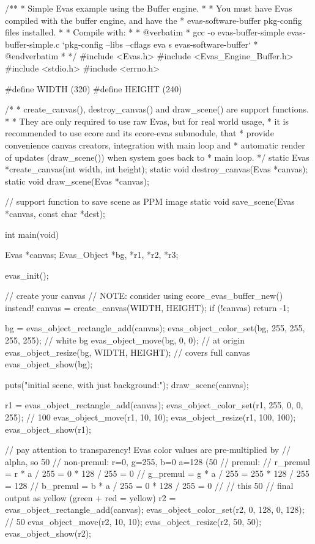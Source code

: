 \begin{DoxyCodeInclude}
/**
 * Simple Evas example using the Buffer engine.
 *
 * You must have Evas compiled with the buffer engine, and have the
 * evas-software-buffer pkg-config files installed.
 *
 * Compile with:
 *
 * @verbatim
 * gcc -o evas-buffer-simple evas-buffer-simple.c `pkg-config --libs --cflags eva
      s evas-software-buffer`
 * @endverbatim
 *
 */
#include <Evas.h>
#include <Evas_Engine_Buffer.h>
#include <stdio.h>
#include <errno.h>

#define WIDTH (320)
#define HEIGHT (240)

/*
 * create_canvas(), destroy_canvas() and draw_scene() are support functions.
 *
 * They are only required to use raw Evas, but for real world usage,
 * it is recommended to use ecore and its ecore-evas submodule, that
 * provide convenience canvas creators, integration with main loop and
 * automatic render of updates (draw_scene()) when system goes back to
 * main loop.
 */
static Evas *create_canvas(int width, int height);
static void destroy_canvas(Evas *canvas);
static void draw_scene(Evas *canvas);

// support function to save scene as PPM image
static void save_scene(Evas *canvas, const char *dest);

int main(void)
{
   Evas *canvas;
   Evas_Object *bg, *r1, *r2, *r3;

   evas_init();

   // create your canvas
   // NOTE: consider using ecore_evas_buffer_new() instead!
   canvas = create_canvas(WIDTH, HEIGHT);
   if (!canvas)
     return -1;

   bg = evas_object_rectangle_add(canvas);
   evas_object_color_set(bg, 255, 255, 255, 255); // white bg
   evas_object_move(bg, 0, 0);                    // at origin
   evas_object_resize(bg, WIDTH, HEIGHT);         // covers full canvas
   evas_object_show(bg);

   puts("initial scene, with just background:");
   draw_scene(canvas);

   r1 = evas_object_rectangle_add(canvas);
   evas_object_color_set(r1, 255, 0, 0, 255); // 100%
   evas_object_move(r1, 10, 10);
   evas_object_resize(r1, 100, 100);
   evas_object_show(r1);

   // pay attention to transparency! Evas color values are pre-multiplied by
   // alpha, so 50%
   // non-premul: r=0, g=255, b=0    a=128 (50%
   // premul:
   //         r_premul = r * a / 255 =      0 * 128 / 255 =      0
   //         g_premul = g * a / 255 =    255 * 128 / 255 =    128
   //         b_premul = b * a / 255 =      0 * 128 / 255 =      0
   //
   // this 50%
   // final output as yellow (green + red = yellow)
   r2 = evas_object_rectangle_add(canvas);
   evas_object_color_set(r2, 0, 128, 0, 128); // 50%
   evas_object_move(r2, 10, 10);
   evas_object_resize(r2, 50, 50);
   evas_object_show(r2);

}
\end{DoxyCodeInclude}
